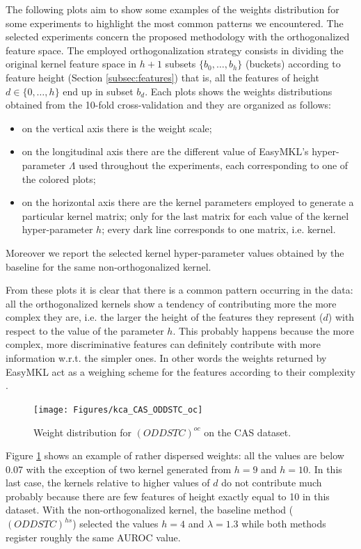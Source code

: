 The following plots aim to show some examples of the weights distribution for some
experiments to highlight the most common patterns we encountered.
The selected experiments concern the proposed methodology with the orthogonalized
feature space.
The employed orthogonalization strategy consists in dividing the original kernel feature space
in $h+1$ subsets $\{b_0,\dots,b_h\}$ (buckets) according to feature height (Section \ref{subsec:features})
that is, all the features of height $d \in \{0,\dots,h\}$ end up in subset $b_d$.
Each plots shows the weights distributions obtained from the 10-fold cross-validation
and they are organized as follows:
\begin{itemize}
    \item on the vertical axis there is the weight scale;
    \item on the longitudinal axis there are the different value of EasyMKL's
        hyper-parameter $\Lambda$ used throughout the experiments, each corresponding
        to one of the colored plots;
    \item on the horizontal axis there are the kernel parameters employed to generate
        a particular kernel matrix; only for the last matrix for each value of the
        kernel hyper-parameter $h$; every dark line corresponds to one matrix, i.e. kernel.
\end{itemize}
Moreover we report the selected kernel hyper-parameter values obtained by the baseline for the
same non-orthogonalized kernel.

From these plots it is clear that there is a common pattern occurring in the data: all the orthogonalized
kernels show a tendency of contributing more the more complex they are, i.e. the larger the
height of the features they represent ($d$) with respect to the value of the parameter $h$.
This probably happens because the more complex, more discriminative features can
definitely contribute with more information w.r.t. the simpler ones.
In other words the weights returned by EasyMKL act as a weighing scheme for the features
according to their complexity \cite{gmkl}.

\begin{figure}[ht]
    \centering
    \texttt{[image: Figures/kca\_CAS\_ODDSTC\_oc]}
    \caption{\footnotesize Weight distribution for $(ODDSTC)^{oc}$ on the CAS dataset.}
    \label{fig:cas_stc}
\end{figure}
 
Figure \ref{fig:cas_stc} shows an example of rather dispersed weights: all the values
are below 0.07 with the exception of two kernel generated from $h=9$ and $h=10$.
In this last case, the kernels relative to higher values of $d$ do not contribute much
probably because there are few features of height exactly equal to 10 in this dataset.
With the non-orthogonalized kernel, the baseline method ($(ODDSTC)^{hs}$) selected the values $h=4$ and $\lambda=1.3$
while both methods register roughly the same AUROC value.

